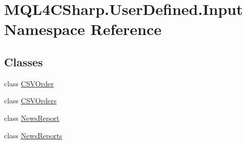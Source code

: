 \hypertarget{namespace_m_q_l4_c_sharp_1_1_user_defined_1_1_input}{}\section{M\+Q\+L4\+C\+Sharp.\+User\+Defined.\+Input Namespace Reference}
\label{namespace_m_q_l4_c_sharp_1_1_user_defined_1_1_input}
\subsection*{Classes}
\begin{DoxyCompactItemize}
\item 
class \hyperlink{class_m_q_l4_c_sharp_1_1_user_defined_1_1_input_1_1_c_s_v_order}{C\+S\+V\+Order}
\item 
class \hyperlink{class_m_q_l4_c_sharp_1_1_user_defined_1_1_input_1_1_c_s_v_orders}{C\+S\+V\+Orders}
\item 
class \hyperlink{class_m_q_l4_c_sharp_1_1_user_defined_1_1_input_1_1_news_report}{News\+Report}
\item 
class \hyperlink{class_m_q_l4_c_sharp_1_1_user_defined_1_1_input_1_1_news_reports}{News\+Reports}
\end{DoxyCompactItemize}
